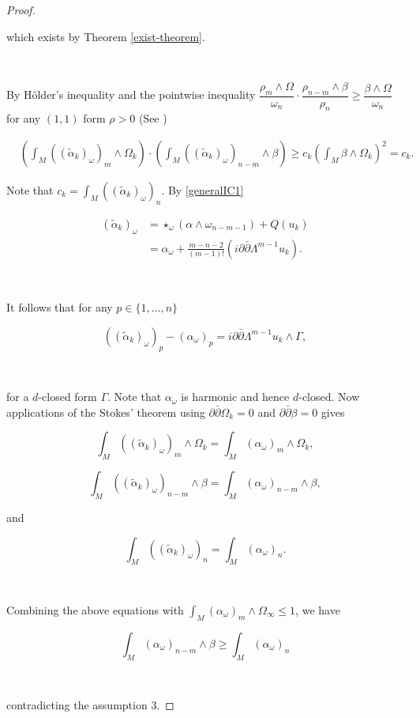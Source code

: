 \documentclass[11pt,letterpaper]{amsart}
\newcommand{\pbp}{\partial \bar{\partial}}
\numberwithin{equation}{section}
\begin{document}
\begin{proof}
  \

  \noindent which exists by Theorem \ref{exist-theorem}.

  \

  By H\"older's inequality and the pointwise inequality $\dfrac{\rho_m \wedge \Omega}{\omega_n} \cdot \dfrac{\rho_{n-m} \wedge \beta}{\rho_n} \geq \dfrac{\beta \wedge \Omega}{\omega_n}$ for any $(1,1)$ form $\rho>0$ (See \cite[p.~25]{DP25})

$$\begin{aligned}
&\left( \int_M ((\tilde{\alpha}_k)_\omega)_m \wedge \Omega_k \right) \cdot \left( \int_M ((\tilde{\alpha}_k)_\omega)_{n-m} \wedge \beta \right) \geq c_k \left( \int_M \beta \wedge \Omega_k \right)^2 = c_k.
\end{aligned}$$


Note that $c_k = \int_M ((\tilde{\alpha}_k)_\omega)_n $. By \eqref{generalIC1}

$$\begin{aligned}
(\tilde{\alpha}_k)_\omega &= \star_{\omega}\left(\alpha \wedge \omega_{n-m-1}\right) + Q(u_k) \\
&= \alpha_\omega  + \frac{m-n-2}{(m-1)!}\left( i \pbp \Lambda^{m-1}  u_k \right).
\end{aligned}$$

\

It follows that for any $p \in \{1,\hdots, n\}$

$$((\tilde{\alpha}_k)_\omega)_p - (\alpha_\omega)_p = i\pbp \Lambda^{m-1} u_k \wedge \Gamma ,$$

\

\noindent for a $d$-closed form $\Gamma$. Note that $\alpha_{\omega}$ is harmonic and hence $d$-closed. Now applications of the Stokes' theorem using $\pbp \Omega_k=0$ and $\pbp \beta = 0$ gives

$$ \int_M ((\tilde{\alpha}_k)_\omega)_m \wedge \Omega_k = \int_M (\alpha_\omega)_m \wedge \Omega_k,$$

$$ \int_M ((\tilde{\alpha}_k)_\omega)_{n-m} \wedge \beta =  \int_M (\alpha_\omega)_{n-m} \wedge \beta , $$


\noindent and

$$\int_M ((\tilde{\alpha}_k)_\omega)_n =\int_M ({\alpha}_\omega)_n .$$


\

Combining the above equations with $\int_{M} (\alpha_{\omega})_{m} \wedge \Omega_{\infty} \leq 1$, we have


$$\int_{M} (\alpha_{\omega})_{n-m} \wedge \beta \geq \int_{M} (\alpha_{\omega})_{n}$$

\

\noindent contradicting the assumption $3$.



\end{proof}
\end{document}
